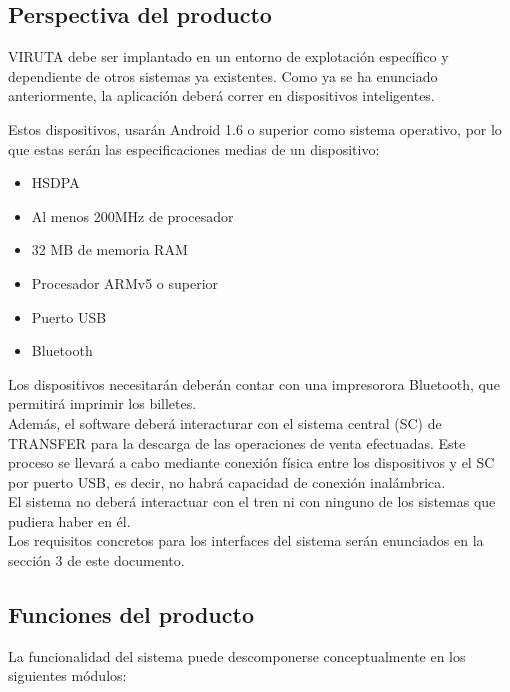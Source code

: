 \subsection{Perspectiva del producto}

VIRUTA debe ser implantado en un entorno de explotación específico y dependiente de otros sistemas ya existentes. Como ya se ha enunciado anteriormente, la aplicación deberá correr en dispositivos inteligentes.

Estos dispositivos, usarán Android 1.6 o superior como sistema operativo, por lo que estas serán las especificaciones medias de un dispositivo:

\begin{itemize}
\item HSDPA
\item Al menos 200MHz de procesador
\item 32 MB de memoria RAM
\item Procesador ARMv5 o superior 
\item Puerto USB
\item Bluetooth
\end{itemize}

Los dispositivos necesitarán deberán contar con una impresorora Bluetooth, que permitirá imprimir los billetes.\\

Además, el software deberá interacturar con el sistema central (SC) de TRANSFER para la descarga de las operaciones de venta efectuadas.   Este proceso se llevará a cabo mediante conexión física entre los dispositivos y el SC por puerto USB, es decir, no habrá capacidad de conexión inalámbrica.\\

El sistema no deberá interactuar con el tren ni con ninguno de los sistemas que pudiera haber en él.\\

Los requisitos concretos para los interfaces del sistema serán enunciados en la sección 3 de este documento.


\subsection{Funciones del producto}

La funcionalidad del sistema puede descomponerse conceptualmente en los siguientes módulos:

